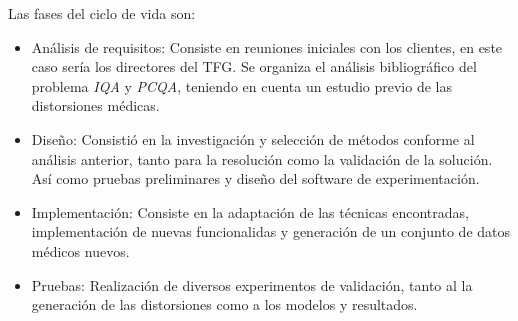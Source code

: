 Las fases del ciclo de vida son: 
\begin{itemize}
  \item Análisis de requisitos: Consiste en reuniones iniciales con los clientes, 
    en este caso sería los directores del TFG. Se organiza el análisis bibliográfico 
    del problema \emph{IQA} y \emph{PCQA}\footnotemark[4], teniendo en cuenta un estudio previo 
    de las distorsiones médicas.
  \item Diseño: Consistió en la investigación y selección de métodos conforme 
    al análisis anterior, tanto para la resolución como la validación de la solución. 
    Así como pruebas preliminares y diseño del software de experimentación. 
  \item Implementación: Consiste en la adaptación de las técnicas encontradas, 
    implementación de nuevas funcionalidas y generación de un conjunto de datos 
    médicos nuevos.
  \item Pruebas: Realización de diversos experimentos de validación, tanto al 
    la generación de las distorsiones como a los modelos y resultados.
\end{itemize}

